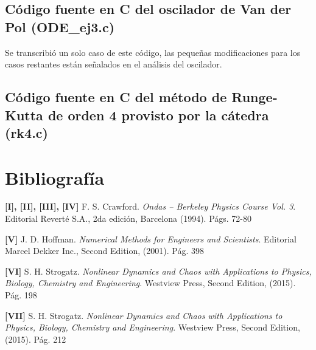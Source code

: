 \documentclass[a4paper,12pt]{article}
\begin{document}


\subsection{C\'odigo fuente en C del oscilador de Van der Pol (ODE\_ej3.c)}
Se transcribi\'o un solo caso de este c\'odigo, las peque\~nas modificaciones para los casos restantes est\'an se\~nalados en el an\'alisis del oscilador.



\subsection{C\'odigo fuente en C del m\'etodo de Runge-Kutta de orden 4 provisto por la c\'atedra (rk4.c)}


\section{Bibliograf\'ia}
\textbf{[I], [II], [III], [IV]} F. S. Crawford. \textit{Ondas – Berkeley Physics Course Vol. 3}. Editorial Revert\'e S.A., 2da edici\'on, Barcelona (1994). P\'ags. 72-80

\textbf{[V]} J. D. Hoffman. \textit{Numerical Methods for Engineers and Scientists}. Editorial Marcel Dekker Inc., Second Edition, (2001). P\'ag. 398

\textbf{[VI]} S. H. Strogatz. \textit{Nonlinear Dynamics and Chaos with Applications to Physics, Biology, Chemistry and Engineering}. Westview Press, Second Edition, (2015). P\'ag. 198

\textbf{[VII]} S. H. Strogatz. \textit{Nonlinear Dynamics and Chaos with Applications to Physics, Biology, Chemistry and Engineering}. Westview Press, Second Edition, (2015). P\'ag. 212
\end{document}
